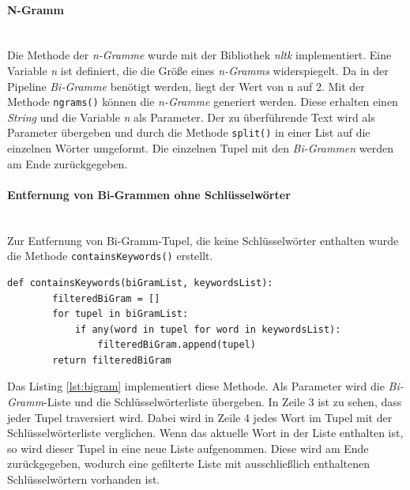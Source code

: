 \paragraph{N-Gramm}\mbox{}\\
Die Methode der \emph{n-Gramme} wurde mit der Bibliothek \emph{nltk} implementiert.
Eine Variable \emph{n} ist definiert, die die Größe eines \emph{n-Gramms} widerspiegelt. Da in der Pipeline \emph{Bi-Gramme} benötigt werden, liegt der Wert von n auf 2. Mit der Methode \lstinline{ngrams()}
können die \emph{n-Gramme} generiert werden. Diese erhalten einen \emph{String} und die Variable \emph{n} als Parameter. Der zu überführende Text wird als Parameter übergeben und durch die Methode \lstinline{split()}
in einer List auf die einzelnen Wörter umgeformt. Die einzelnen Tupel mit den \emph{Bi-Grammen} werden am Ende zurückgegeben.
\paragraph{Entfernung von Bi-Grammen ohne Schlüsselwörter}\mbox{}\\
Zur Entfernung von Bi-Gramm-Tupel, die keine Schlüsselwörter enthalten wurde die Methode \lstinline{containsKeywords()} erstellt.
\begin{lstlisting}[caption={Implementation der Filterung für Schlüsselwörter in einer Bi-Gramm Liste}, label=lst:bigram]
	def containsKeywords(biGramList, keywordsList):
		filteredBiGram = []
		for tupel in biGramList:
			if any(word in tupel for word in keywordsList):
				filteredBiGram.append(tupel)
		return filteredBiGram
\end{lstlisting}
Das Listing \ref{lst:bigram} implementiert diese Methode. Als Parameter wird die \emph{Bi-Gramm}-Liste und die Schlüsselwörterliste übergeben. In Zeile 3 ist zu sehen, dass jeder Tupel traversiert wird. Dabei wird in Zeile 4 jedes Wort im Tupel mit der Schlüsselwörterliste verglichen. Wenn das aktuelle Wort in der Liste enthalten ist, so wird dieser Tupel in eine neue Liste aufgenommen. Diese wird am Ende zurückgegeben, wodurch eine gefilterte Liste mit ausschließlich enthaltenen Schlüsselwörtern vorhanden ist.
